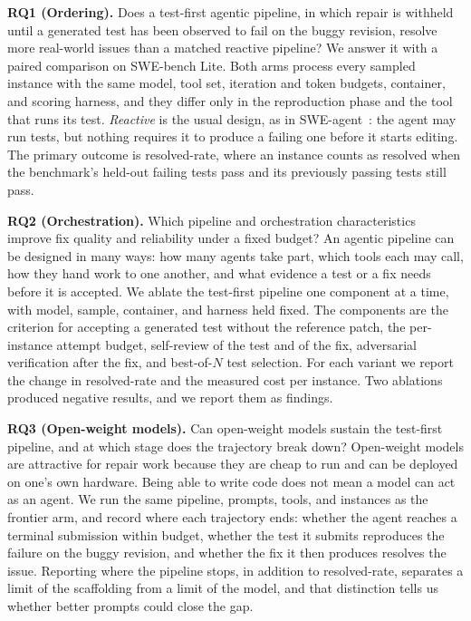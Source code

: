 \textbf{RQ1 (Ordering).} Does a test-first agentic pipeline, in which repair is
withheld until a generated test has been observed to fail on the buggy
revision, resolve more real-world issues than a matched reactive pipeline? We
answer it with a paired comparison on SWE-bench Lite. Both arms process every
sampled instance with the same model, tool set, iteration and token budgets,
container, and scoring harness, and they differ only in the reproduction phase
and the tool that runs its test. \emph{Reactive} is the usual design, as in
SWE-agent~\cite{Yang2024SWEagent}: the agent may run tests, but nothing
requires it to produce a failing one before it starts editing. The primary
outcome is resolved-rate, where an instance counts as resolved when the
benchmark's held-out failing tests pass and its previously passing tests still
pass.

\textbf{RQ2 (Orchestration).} Which pipeline and orchestration characteristics
improve fix quality and reliability under a fixed budget? An agentic pipeline
can be designed in many ways: how many agents take part, which tools each may
call, how they hand work to one another, and what evidence a test or a fix
needs before it is accepted. We ablate the test-first pipeline one component
at a time, with model, sample, container, and harness held fixed. The
components are the criterion for accepting a generated test without the
reference patch, the per-instance attempt budget, self-review of the test and
of the fix, adversarial verification after the fix, and best-of-$N$ test
selection. For each variant we report the change in resolved-rate and the
measured cost per instance. Two ablations produced negative results, and we
report them as findings.

\textbf{RQ3 (Open-weight models).} Can open-weight models sustain the
test-first pipeline, and at which stage does the trajectory break down?
Open-weight models are attractive for repair work because they are cheap to
run and can be deployed on one's own hardware. Being able to write code does
not mean a model can act as an agent. We run the same pipeline, prompts,
tools, and instances as the frontier arm, and record where each trajectory
ends: whether the agent reaches a terminal submission within budget, whether
the test it submits reproduces the failure on the buggy revision, and whether
the fix it then produces resolves the issue. Reporting where the pipeline stops,
in addition to resolved-rate, separates a limit of the scaffolding from a limit
of the model, and that distinction tells us whether better prompts could close
the gap.

